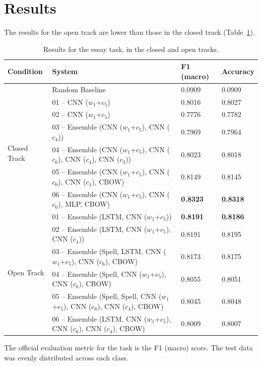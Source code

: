 \documentclass[11pt,letterpaper]{article}
\begin{document}
\section{Results}
The results for the open track are lower than those in the closed track (Table~\ref{tab:results}).

\begin{table}[h]
    \small
\center
\caption{Results for the essay task, in the closed and open tracks.}
\label{tab:results}
\begin{tabular}{llll}
\toprule
\bf Condition & \bf System & \bf F1 (macro) & \bf Accuracy \\
\midrule
& Random Baseline & 0.0909 & 0.0909 \\
\midrule
\multirow{6}{*}{Closed Track} & 01 -- CNN ($w_1$+$c_5$) & 0.8016 & 0.8027 \\
& 02 -- CNN ($w_1$+$c_5$) & 0.7776 & 0.7782 \\
& 03 -- Ensemble (CNN ($w_1$+$c_5$), CNN ($c_4$)) & 0.7969 & 0.7964 \\
& 04 -- Ensemble (CNN ($w_1$+$c_5$), CNN ($c_6$), CNN ($c_4$), CNN ($c_3$)) & 0.8023 & 0.8018 \\
& 05 -- Ensemble (CNN ($w_1$+$c_5$), CNN ($c_6$), CNN ($c_4$), CBOW) & 0.8149 & 0.8145 \\
& 06 -- Ensemble (CNN ($w_1$+$c_5$), CNN ($c_6$), MLP, CBOW) & \bf 0.8323 & \bf 0.8318 \\
\midrule
\multirow{6}{*}{Open Track} & 01 -- Ensemble (LSTM, CNN ($w_1$+$c_5$)) & \bf 0.8191 & \bf 0.8186 \\
& 02 -- Ensemble (LSTM, CNN ($w_1$+$c_5$), CNN ($c_4$)) & 0.8191   &  0.8195 \\
& 03 -- Ensemble (Spell, LSTM, CNN ($w_1$+$c_5$), CNN ($c_6$), CBOW) & 0.8173   &  0.8175 \\
& 04 -- Ensemble (Spell, CNN ($w_1$+$c_5$), CNN ($c_6$), CBOW) & 0.8055   &  0.8051 \\
& 05 -- Ensemble (Spell, Spell, CNN ($w_1$+$c_5$), CNN ($c_6$), CNN ($c_4$), CBOW) & 0.8045   &  0.8048 \\
& 06 -- Ensemble (LSTM, CNN ($w_1$+$c_5$), CNN ($c_6$), CNN ($c_4$), CBOW)& 0.8009   &  0.8007 \\
\bottomrule
\end{tabular}
\end{table}

The official evaluation metric for the task is the F1 (macro) score.
The test data was evenly distributed across each class.
\end{document}
